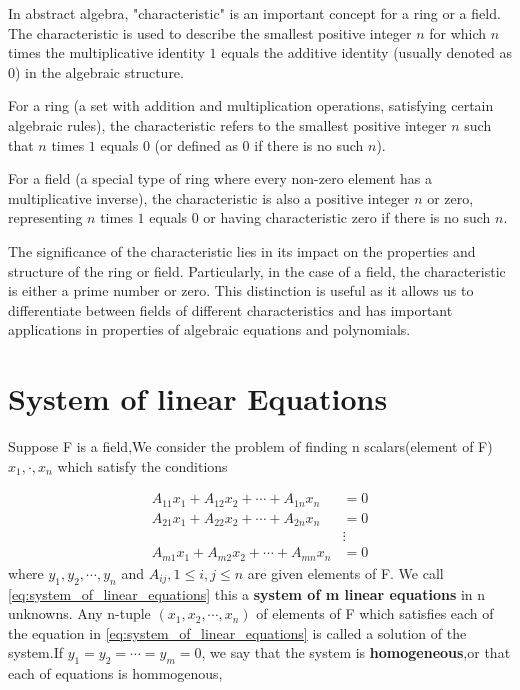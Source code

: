 \newpage
\begin{definition}[Characteristic]
	In abstract algebra, "characteristic" is an important concept for a ring or a field. The characteristic is used to describe the smallest positive integer $n$ for which $n$ times the multiplicative identity $1$ equals the additive identity (usually denoted as $0$) in the algebraic structure.

	For a ring (a set with addition and multiplication operations, satisfying certain algebraic rules), the characteristic refers to the smallest positive integer $n$ such that $n$ times $1$ equals $0$ (or defined as $0$ if there is no such $n$).

	For a field (a special type of ring where every non-zero element has a multiplicative inverse), the characteristic is also a positive integer $n$ or zero, representing $n$ times $1$ equals $0$ or having characteristic zero if there is no such $n$.

	The significance of the characteristic lies in its impact on the properties and structure of the ring or field. Particularly, in the case of a field, the characteristic is either a prime number or zero. This distinction is useful as it allows us to differentiate between fields of different characteristics and has important applications in properties of algebraic equations and polynomials.
\end{definition}

\section{System of linear Equations} %
\label{sec:system_of_linear_equations}



Suppose F is a field,We consider the problem of finding n scalars(element of F)$x_1,\cdot,x_n$ which satisfy the conditions

\begin{equation}
	\begin{aligned}
		A_{11} x_1 + A_{12} x_2 + \cdots + A_{1n} x_n & = 0    \\
		A_{21} x_1 + A_{22} x_2 + \cdots + A_{2n} x_n & = 0    \\
		                                              & \vdots \\
		A_{m1} x_1 + A_{m2} x_2 + \cdots + A_{mn} x_n & = 0
	\end{aligned}
	\label{eq:system_of_linear_equations}
\end{equation}
where $y_1,y_2,\cdots,y_n$ and $A_{ij},1\leq i,j\leq n$ are given elements of F.
We call \ref{eq:system_of_linear_equations} this a \textbf{system of m linear equations} in n unknowns.
Any n-tuple $(x_1,x_2,\cdots,x_n)$ of elements of F which satisfies each of the equation in \ref{eq:system_of_linear_equations} is called a solution of the system.If $y_1 = y_2 = \cdots = y_m = 0$,
we say that the system is \textbf{homogeneous},or that each of equations is hommogenous,

